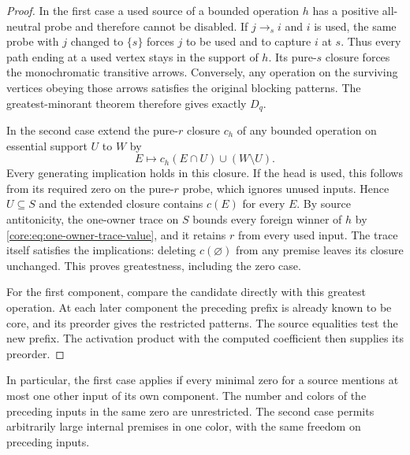 \begin{proof}
In the first case a used source of a bounded operation $h$ has a
positive all-neutral probe and therefore cannot be disabled. If
$j\to_s i$ and $i$ is used, the same probe with $j$ changed to
$\{s\}$ forces $j$ to be used and to capture $i$ at $s$. Thus
every path ending at a used vertex stays in the support of $h$.
Its pure-$s$ closure forces the monochromatic transitive arrows.
Conversely, any operation on the surviving vertices obeying those
arrows satisfies the original blocking patterns. The greatest-minorant
theorem therefore gives exactly $D_q$.

In the second case extend the pure-$r$ closure $c_h$ of any bounded
operation on essential support $U$ to $W$ by
\[
       E\longmapsto c_h(E\cap U)\cup(W\setminus U).
\]
Every generating implication holds in this closure. If the head is
used, this follows from its required zero on the pure-$r$ probe,
which ignores unused inputs. Hence $U\subseteq S$ and the extended
closure contains $c(E)$ for every $E$. By source antitonicity, the
one-owner trace on $S$ bounds every foreign winner of $h$ by
\eqref{core:eq:one-owner-trace-value}, and it retains $r$ from every
used input. The trace itself satisfies the implications: deleting
$c(\varnothing)$ from any premise leaves its closure unchanged.
This proves greatestness, including the zero case.

For the first component, compare the candidate directly with this
greatest operation. At each later component the preceding prefix is
already known to be core, and its preorder gives the restricted
patterns. The source equalities test the new prefix. The activation
product with the computed coefficient then supplies its preorder.
\end{proof}

In particular, the first case applies if every minimal zero for a
source mentions at most one other input of its own component. The
number and colors of the preceding inputs in the same zero are
unrestricted. The second case permits arbitrarily large internal
premises in one color, with the same freedom on preceding inputs.

